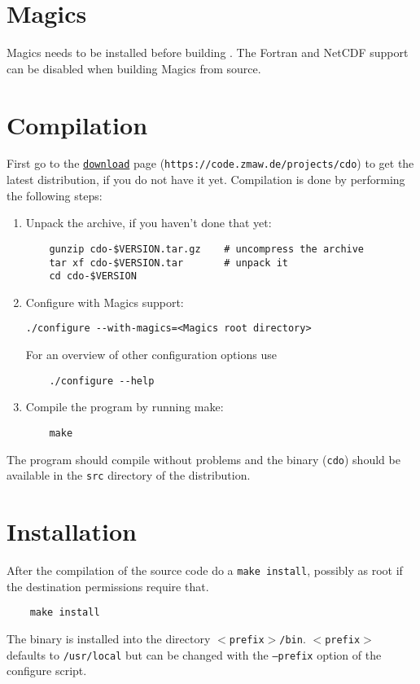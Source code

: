 \section{Magics}
 
Magics needs to be installed before building {\CDO}.
The Fortran and NetCDF support can be disabled when building Magics from source.

\section{Compilation}

First go to the {\CDO}  \href{https://code.zmaw.de/projects/cdo}{\texttt{download}} page
(\texttt{https://code.zmaw.de/projects/cdo}) to get the latest distribution,
if you do not have it yet.
Compilation is done by performing the following steps:

\begin{enumerate}
\item Unpack the archive, if you haven't done that yet:
   
\begin{verbatim}
    gunzip cdo-$VERSION.tar.gz    # uncompress the archive
    tar xf cdo-$VERSION.tar       # unpack it
    cd cdo-$VERSION
\end{verbatim}

\item Configure {\CDO} with Magics support:
 
\begin{verbatim}
./configure --with-magics=<Magics root directory>
\end{verbatim}

For an overview of other configuration options use

\begin{verbatim}
    ./configure --help
\end{verbatim}

\item Compile the program by running make:

\begin{verbatim}
    make
\end{verbatim}

\end{enumerate}

The program should compile without problems and the binary (\texttt{cdo}) 
should be available in the \texttt{src} directory of the distribution.


\section{Installation}

After the compilation of the source code do a \texttt{make install},
possibly as root if the destination permissions require that.

\begin{verbatim}
    make install
\end{verbatim} 

The binary is installed into the directory \texttt{$<$prefix$>$/bin}.
\texttt{$<$prefix$>$} defaults to \texttt{/usr/local} but can be changed with 
the \texttt{--prefix} option of the configure script. 
